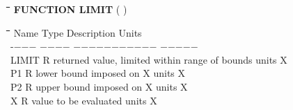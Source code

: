 \bigskip
\nwln
\begin{tabbing}
\hspace{1.27cm}\=\hspace{1.27cm}\=\hspace{1.27cm}\=\hspace{1.27cm}\=%
\hspace{1.27cm}\=\hspace{1.27cm}\=\hspace{1.27cm}\=\hspace{1.27cm}\=%
\hspace{1.27cm}\=\hspace{1.27cm}\=\kill
{\bf FUNCTION LIMIT}\> \> \> ( )
\end{tabbing}
\nwln
\begin{tabbing}
\hspace{1.27cm}\=\hspace{1.27cm}\=\hspace{1.27cm}\=\hspace{1.27cm}\=%
\hspace{1.27cm}\=\hspace{1.27cm}\=\hspace{1.27cm}\=\hspace{1.27cm}\=%
\hspace{1.27cm}\=\hspace{1.27cm}\=\kill
Name    \> \> Type   \> Description                                        \> \> \> \> \> \> \> Units\\
-$-$$-$$-$    \> \> $-$$-$$-$$-$   \> $-$$-$$-$$-$$-$$-$$-$$-$$-$$-$$-$                                        \> \> \> \> \> \> \> $-$$-$$-$$-$$-$\\
LIMIT   \> \> R   \> returned value, limited within range of bounds     \> \> \> \> \> \> \> units X\\
P1      \> \> R   \> lower bound imposed on X                           \> \> \> \> \> \> \> units X\\
P2      \> \> R   \> upper bound imposed on X                           \> \> \> \> \> \> \> units X\\
X       \> \> R   \> value to be evaluated                              \> \> \> \> \> \> \> units X
\end{tabbing}


